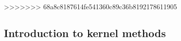 >>>>>>> 68a8c8187614fe541360c89c36b8192178611905

\subsection{Introduction to kernel methods}\label{subsec:kernels}
